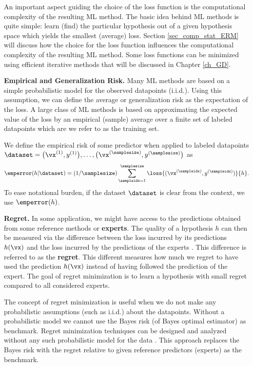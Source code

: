\documentclass[12pt]{report}
\begin{document}
An important aspect guiding the choice of the loss function is the 
computational complexity of the resulting ML method. The basic 
idea behind ML methods is quite simple: learn (find) the particular 
hypothesis out of a given hypothesis space which yields the smallest 
(average) loss. Section \ref{sec_comp_stat_ERM} will discuss how  
the choice for the loss function influences the computational complexity 
of the resulting ML method. Some loss functions can be minimized using 
efficient iterative methods that will be discussed in Chapter \ref{ch_GD}. 


{\bf Empirical and Generalization Risk.} 
Many ML methods are based on a simple probabilistic model for the 
observed datapoints (i.i.d.). Using this assumption, we can define the 
average or generalization risk as the expectation of the loss. A large class 
of ML methods is based on approximating the expected value of the loss 
by an empirical (sample) average over a finite set of labeled datapoints which 
are we refer to as the training set. 

We define the empirical risk of some predictor when applied to labeled datapoints $\dataset=\big(\vx^{(1)},y^{(1)}\big),\ldots,\big(\vx^{(\samplesize)},y^{(\samplesize)}\big)$ 
as 
\begin{equation} 
\label{eq_def_emp_error_101}
\emperror(h|\dataset) = (1/\samplesize)\sum_{\sampleidx=1}^{\samplesize} \loss{(\vx^{(\sampleidx)},y^{(\sampleidx)})}{h}.  
\end{equation} 
To ease notational burden, if the dataset $\dataset$ is clear from the context, 
we use $\emperror(h)$. 

{\bf Regret.} In some application, we might have access to the 
predictions obtained from some reference methods or {\bf experts}. 
The quality of a hypothesis $h$ can then be measured via the 
difference between the loss incurred by its predictions 
$h(\vx)$ and the loss incurred by the predictions of the experts 
\cite{HazanOCO}. This difference is referred to as the {\bf regret}. 
This different measures how much we regret to have used the 
prediction $h(\vx)$ instead of having followed the prediction of the expert. 
The goal of regret minimization is to learn a hypothesis 
with small regret compared to all considered experts. 

The concept of regret minimization is useful when we do 
not make any probabilistic assumptions (such as i.i.d.) about 
the datapoints. Without a probabilistic model we cannot use 
the Bayes risk (of Bayes optimal estimator) as benchmark. 
Regret minimization techniques can be designed and analyzed 
without any such probabilistic model for the data \cite{PredictionLearningGames}. 
This approach replaces the Bayes risk with the regret relative to 
given reference predictors (experts) as the benchmark. 
\end{document}

